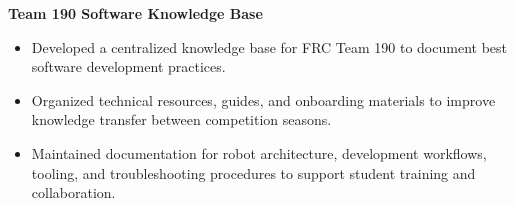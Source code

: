 \textbf{Team 190 Software Knowledge Base}
\begin{itemize}
  \item Developed a centralized knowledge base for FRC Team 190 to document best software development practices.
  \item Organized technical resources, guides, and onboarding materials to improve knowledge transfer between competition seasons.
  \item Maintained documentation for robot architecture, development workflows, tooling, and troubleshooting procedures to support student training and collaboration.
\end{itemize}